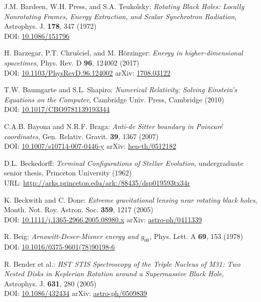 \begin{thebibliography}{123}
J.M. Bardeen, W.H. Press, and S.A. Teukolsky:
{\em Rotating Black Holes: Locally Nonrotating Frames, Energy Extraction, and Scalar Synchrotron Radiation},
Astrophys. J. {\bf  178}, 347 (1972)\\
DOI: \href{https://doi.org/10.1086/151796}{10.1086/151796}

H. Barzegar, P.T. Chruściel, and M. Hörzinger:
{\em Energy in higher-dimensional spacetimes},
Phys. Rev. D {\bf 96}, 124002 (2017)\\
DOI: \href{https://doi.org/10.1103/PhysRevD.96.124002}{10.1103/PhysRevD.96.124002}\hfill
arXiv: \href{https://arxiv.org/abs/1708.03122}{1708.03122}

T.W. Baumgarte and S.L. Shapiro:
{\em Numerical Relativity: Solving Einstein's Equations on the Computer},
Cambridge Univ. Press, Cambridge (2010)\\
DOI: \href{https://doi.org/10.1017/CBO9781139193344}{10.1017/CBO9781139193344}

C.A.B. Bayona and N.R.F. Braga:
{\em Anti-de Sitter boundary in Poincaré coordinates},
Gen. Relativ. Gravit. {\bf 39}, 1367 (2007)\\
DOI: \href{https://doi.org/10.1007/s10714-007-0446-y}{10.1007/s10714-007-0446-y}\hfill
arXiv: \href{https://arxiv.org/abs/hep-th/0512182}{hep-th/0512182}

D.L. Beckedorff:
{\em Terminal Configurations of Stellar Evolution},
undergraduate senior thesis, Princeton University (1962)\\
URL: \url{http://arks.princeton.edu/ark:/88435/dsp019593tx34r}

K. Beckwith and C. Done:
{\em Extreme gravitational lensing near rotating black holes},
Month. Not. Roy. Astron. Soc. {\bf 359}, 1217 (2005)\\
DOI: \href{https://doi.org/10.1111/j.1365-2966.2005.08980.x}{10.1111/j.1365-2966.2005.08980.x}\hfill
arXiv: \href{https://arxiv.org/abs/astro-ph/0411339}{astro-ph/0411339}

R. Beig:
{\em Arnowitt-Deser-Misner energy and $g_{00}$},
Phys. Lett. A {\bf 69}, 153 (1978)\\
DOI: \href{https://doi.org/10.1016/0375-9601(78)90198-6}{10.1016/0375-9601(78)90198-6}

R. Bender et al.:
{\em HST STIS Spectroscopy of the Triple Nucleus of M31: Two Nested Disks in Keplerian Rotation around a Supermassive Black Hole},
Astrophys. J. {\bf 631}, 280 (2005)\\
DOI: \href{https://doi.org/10.1086/432434}{10.1086/432434}\hfill
arXiv: \href{https://arxiv.org/abs/astro-ph/0509839}{astro-ph/0509839}


\end{thebibliography}
